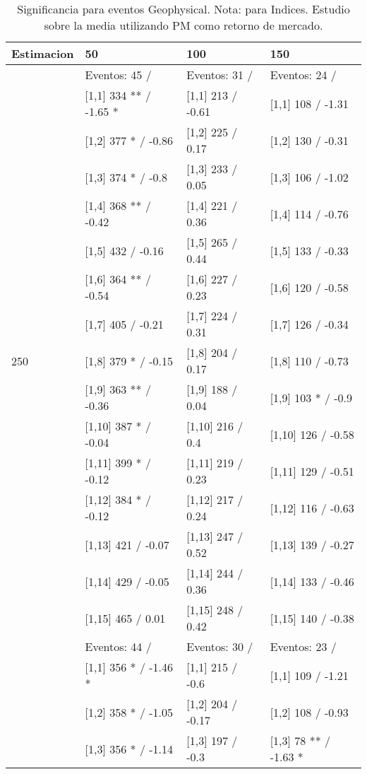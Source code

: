 \begin{table}

\caption{Significancia para eventos Geophysical. Nota: para Indices. Estudio sobre la media utilizando PM como retorno de mercado.}
\centering
\begin{tabular}[t]{llll}
\toprule
Estimacion & 50 & 100 & 150\\
\midrule
 & Eventos:  45 / & Eventos:  31 / & Eventos:  24 /\\
 & {}[1,1] 334 ** / -1.65 * & {}[1,1] 213  / -0.61 & {}[1,1] 108  / -1.31\\
 & {}[1,2] 377 * / -0.86 & {}[1,2] 225  / 0.17 & {}[1,2] 130  / -0.31\\
 & {}[1,3] 374 * / -0.8 & {}[1,3] 233  / 0.05 & {}[1,3] 106  / -1.02\\
 & {}[1,4] 368 ** / -0.42 & {}[1,4] 221  / 0.36 & {}[1,4] 114  / -0.76\\
\addlinespace
 & {}[1,5] 432  / -0.16 & {}[1,5] 265  / 0.44 & {}[1,5] 133  / -0.33\\
 & {}[1,6] 364 ** / -0.54 & {}[1,6] 227  / 0.23 & {}[1,6] 120  / -0.58\\
 & {}[1,7] 405  / -0.21 & {}[1,7] 224  / 0.31 & {}[1,7] 126  / -0.34\\
250 & {}[1,8] 379 * / -0.15 & {}[1,8] 204  / 0.17 & {}[1,8] 110  / -0.73\\
 & {}[1,9] 363 ** / -0.36 & {}[1,9] 188  / 0.04 & {}[1,9] 103 * / -0.9\\
\addlinespace
 & {}[1,10] 387 * / -0.04 & {}[1,10] 216  / 0.4 & {}[1,10] 126  / -0.58\\
 & {}[1,11] 399 * / -0.12 & {}[1,11] 219  / 0.23 & {}[1,11] 129  / -0.51\\
 & {}[1,12] 384 * / -0.12 & {}[1,12] 217  / 0.24 & {}[1,12] 116  / -0.63\\
 & {}[1,13] 421  / -0.07 & {}[1,13] 247  / 0.52 & {}[1,13] 139  / -0.27\\
 & {}[1,14] 429  / -0.05 & {}[1,14] 244  / 0.36 & {}[1,14] 133  / -0.46\\
\addlinespace
 & {}[1,15] 465  / 0.01 & {}[1,15] 248  / 0.42 & {}[1,15] 140  / -0.38\\
 & Eventos:  44 / & Eventos:  30 / & Eventos:  23 /\\
 & {}[1,1] 356 * / -1.46 * & {}[1,1] 215  / -0.6 & {}[1,1] 109  / -1.21\\
 & {}[1,2] 358 * / -1.05 & {}[1,2] 204  / -0.17 & {}[1,2] 108  / -0.93\\
 & {}[1,3] 356 * / -1.14 & {}[1,3] 197  / -0.3 & {}[1,3] 78 ** / -1.63 *\\

\end{tabular}
\end{table}

